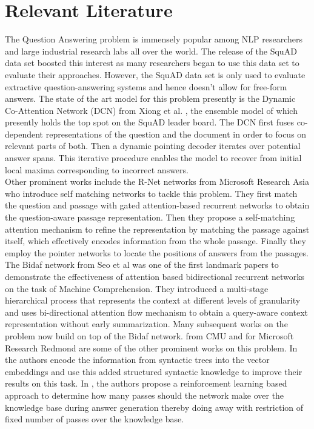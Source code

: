 
\section{Relevant Literature}
\label{lit}

The Question Answering problem is immensely popular among NLP researchers and large industrial research labs all over the world. The release of the SquAD data set \cite{squad} boosted this interest as many researchers began to use this data set to evaluate their approaches. However, the SquAD data set is only used to evaluate extractive question-answering systems and hence doesn't allow for free-form answers. The state of the art model for this problem presently is the Dynamic Co-Attention Network (DCN) from Xiong et al.  \cite{DCN}, the ensemble model of which presently holds the top spot on the SquAD leader board. The DCN first fuses co-dependent representations of the question and the document in order to focus on relevant parts of both. Then a dynamic pointing decoder iterates over potential answer spans. This iterative procedure enables the model to recover from initial local maxima corresponding to incorrect answers. \\

Other prominent works include the R-Net networks from Microsoft Research Asia \cite{Rnet} who introduce self matching networks to tackle this problem. They first match the question and passage with gated attention-based recurrent networks to obtain the question-aware passage representation. Then they propose a self-matching attention mechanism to refine the representation by matching the passage against itself, which effectively encodes information from the whole passage. Finally they employ the pointer networks to locate the positions of answers from the passages.\\

The Bidaf network from Seo et al \cite{bidaf} was one of the first landmark papers to demonstrate the effectiveness of attention based bidirectional recurrent networks on the task of Machine Comprehension.  They introduced a multi-stage hierarchical process that represents the context at different levels of granularity and uses bi-directional attention flow mechanism to obtain a query-aware context representation without early summarization. Many subsequent works on the problem now build on top of the Bidaf network.\cite{Sedt} from CMU and \cite{Reasonet} for Microsoft Research Redmond are some of the other prominent works on this problem. In \cite{Sedt} the authors encode the information from syntactic trees into the vector embeddings and use this added structured syntactic knowledge to improve their results on this task. In \cite{Reasonet}, the authors propose a reinforcement learning based approach to determine how many passes should the network make over the knowledge base during answer generation thereby doing away with restriction of fixed number of passes over the knowledge base.\\

